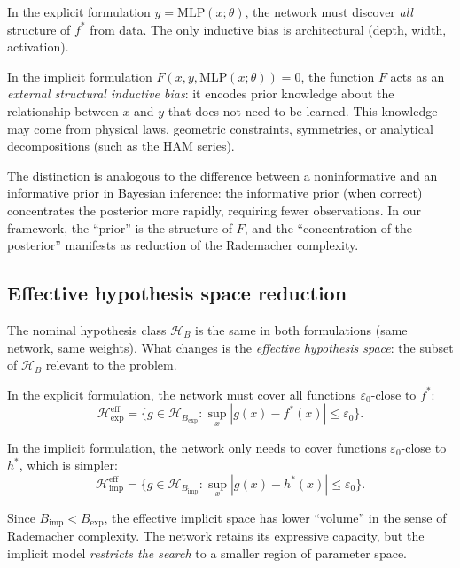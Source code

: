 \documentclass[12pt]{article}
\newcommand{\MLP}{\mathrm{MLP}}
\begin{document}
In the explicit formulation $y = \MLP(x;\theta)$, the network must
discover \emph{all} structure of $f^*$ from data.
The only inductive bias is architectural (depth, width, activation).

In the implicit formulation $F(x, y, \MLP(x;\theta)) = 0$, the
function $F$ acts as an \emph{external structural inductive bias}:
it encodes prior knowledge about the relationship between $x$ and $y$
that does not need to be learned.
This knowledge may come from physical laws, geometric constraints,
symmetries, or analytical decompositions (such as the HAM series).

The distinction is analogous to the difference between a
noninformative and an informative prior in Bayesian inference: the
informative prior (when correct) concentrates the posterior more
rapidly, requiring fewer observations.
In our framework, the ``prior'' is the structure of $F$, and the
``concentration of the posterior'' manifests as reduction of the
Rademacher complexity.

\subsection{Effective hypothesis space reduction}

The nominal hypothesis class $\mathcal{H}_B$ is the same in both
formulations (same network, same weights).
What changes is the \emph{effective hypothesis space}: the subset of
$\mathcal{H}_B$ relevant to the problem.

In the explicit formulation, the network must cover all functions
$\varepsilon_0$-close to $f^*$:
\begin{equation}
  \mathcal{H}_{\mathrm{exp}}^{\mathrm{eff}}
  = \{g \in \mathcal{H}_{B_{\mathrm{exp}}} :
    \sup_x |g(x) - f^*(x)| \le \varepsilon_0\}.
\end{equation}

In the implicit formulation, the network only needs to cover
functions $\varepsilon_0$-close to $h^*$, which is simpler:
\begin{equation}
  \mathcal{H}_{\mathrm{imp}}^{\mathrm{eff}}
  = \{g \in \mathcal{H}_{B_{\mathrm{imp}}} :
    \sup_x |g(x) - h^*(x)| \le \varepsilon_0\}.
\end{equation}

Since $B_{\mathrm{imp}} < B_{\mathrm{exp}}$, the effective implicit
space has lower ``volume'' in the sense of Rademacher complexity.
The network retains its expressive capacity, but the implicit model
\emph{restricts the search} to a smaller region of parameter space.
\end{document}
